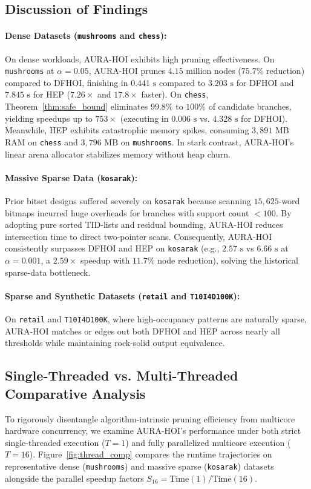\documentclass[runningheads,orivec]{llncs}
\newcommand{\AURA}{\textsc{AURA-HOI}}
\newcommand{\HEP}{\textsc{HEP}}
\newcommand{\DFHOI}{\textsc{DFHOI}}
\begin{document}
\subsection{Discussion of Findings}

\paragraph{Dense Datasets (\texttt{mushrooms} and \texttt{chess}):}
On dense workloads, \AURA{} exhibits high pruning effectiveness. On \texttt{mushrooms} at $\alpha = 0.05$, \AURA{} prunes $4.15$ million nodes ($75.7\%$ reduction) compared to \DFHOI, finishing in $0.441\text{ s}$ compared to $3.203\text{ s}$ for \DFHOI{} and $7.845\text{ s}$ for \HEP{} ($7.26\times$ and $17.8\times$ faster). On \texttt{chess}, Theorem~\ref{thm:safe_bound} eliminates $99.8\%$ to $100\%$ of candidate branches, yielding speedups up to $753\times$ (executing in $0.006\text{ s}$ vs. $4.328\text{ s}$ for \DFHOI). Meanwhile, \HEP{} exhibits catastrophic memory spikes, consuming $3{,}891\text{ MB}$ RAM on \texttt{chess} and $3{,}796\text{ MB}$ on \texttt{mushrooms}. In stark contrast, \AURA's linear arena allocator stabilizes memory without heap churn.

\paragraph{Massive Sparse Data (\texttt{kosarak}):}
Prior bitset designs suffered severely on \texttt{kosarak} because scanning $15{,}625$-word bitmaps incurred huge overheads for branches with support count $< 100$. By adopting pure sorted TID-lists and residual bounding, \AURA{} reduces intersection time to direct two-pointer scans. Consequently, \AURA{} consistently surpasses \DFHOI{} and \HEP{} on \texttt{kosarak} (e.g., $2.57\text{ s}$ vs $6.66\text{ s}$ at $\alpha = 0.001$, a $2.59\times$ speedup with $11.7\%$ node reduction), solving the historical sparse-data bottleneck.

\paragraph{Sparse and Synthetic Datasets (\texttt{retail} and \texttt{T10I4D100K}):}
On \texttt{retail} and \texttt{T10I4D100K}, where high-occupancy patterns are naturally sparse, \AURA{} matches or edges out both \DFHOI{} and \HEP{} across nearly all thresholds while maintaining rock-solid output equivalence.

\subsection{Single-Threaded vs. Multi-Threaded Comparative Analysis}
To rigorously disentangle algorithm-intrinsic pruning efficiency from multicore hardware concurrency, we examine \AURA's performance under both strict single-threaded execution ($T = 1$) and fully parallelized multicore execution ($T = 16$). Figure~\ref{fig:thread_comp} compares the runtime trajectories on representative dense (\texttt{mushrooms}) and massive sparse (\texttt{kosarak}) datasets alongside the parallel speedup factors $S_{16} = \text{Time}(1)/\text{Time}(16)$.
\end{document}
